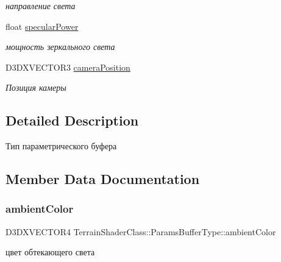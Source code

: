 \begin{DoxyCompactItemize}
\begin{DoxyCompactList}\small\item\em направление света \end{DoxyCompactList}\item 
float \hyperlink{struct_terrain_shader_class_1_1_params_buffer_type_a1c1dbcf94164afb7b737a676dd459b9b}{specular\+Power}
\begin{DoxyCompactList}\small\item\em мощность зеркального света \end{DoxyCompactList}\item 
D3\+D\+X\+V\+E\+C\+T\+O\+R3 \hyperlink{struct_terrain_shader_class_1_1_params_buffer_type_a64c5d7e34700462ac2a56a2fdca227dc}{camera\+Position}
\begin{DoxyCompactList}\small\item\em Позиция камеры \end{DoxyCompactList}\end{DoxyCompactItemize}


\subsection{Detailed Description}
Тип параметрического буфера 

\subsection{Member Data Documentation}
\mbox{\label{struct_terrain_shader_class_1_1_params_buffer_type_a29ba93988854866baf2ae8a16212e12f}} 
\subsubsection{\texorpdfstring{ambient\+Color}{ambientColor}}
{\footnotesize\ttfamily D3\+D\+X\+V\+E\+C\+T\+O\+R4 Terrain\+Shader\+Class\+::\+Params\+Buffer\+Type\+::ambient\+Color}



цвет обтекающего света 

\mbox{\label{struct_terrain_shader_class_1_1_params_buffer_type_a64c5d7e34700462ac2a56a2fdca227dc}} 
